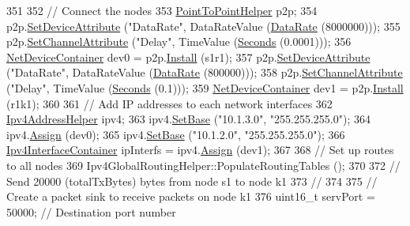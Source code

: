 \begin{DoxyCode}
351 
352   \textcolor{comment}{// Connect the nodes}
353   \hyperlink{classns3_1_1PointToPointHelper}{PointToPointHelper} p2p;
354   p2p.\hyperlink{classns3_1_1PointToPointHelper_a4577f5ab8c387e5528af2e0fbab1152e}{SetDeviceAttribute} (\textcolor{stringliteral}{"DataRate"}, DataRateValue (\hyperlink{classns3_1_1DataRate}{DataRate} (8000000)));
355   p2p.\hyperlink{classns3_1_1PointToPointHelper_a6b5317fd17fb61e5a53f8d66a90b63b9}{SetChannelAttribute} (\textcolor{stringliteral}{"Delay"}, TimeValue (\hyperlink{group__timecivil_ga33c34b816f8ff6628e33d5c8e9713b9e}{Seconds} (0.0001)));
356   \hyperlink{classns3_1_1NetDeviceContainer}{NetDeviceContainer} dev0 = p2p.\hyperlink{classns3_1_1PointToPointHelper_ab9162fea3e88722666fed1106df1f9ec}{Install} (s1r1);
357   p2p.\hyperlink{classns3_1_1PointToPointHelper_a4577f5ab8c387e5528af2e0fbab1152e}{SetDeviceAttribute} (\textcolor{stringliteral}{"DataRate"}, DataRateValue (\hyperlink{classns3_1_1DataRate}{DataRate} (800000)));
358   p2p.\hyperlink{classns3_1_1PointToPointHelper_a6b5317fd17fb61e5a53f8d66a90b63b9}{SetChannelAttribute} (\textcolor{stringliteral}{"Delay"}, TimeValue (\hyperlink{group__timecivil_ga33c34b816f8ff6628e33d5c8e9713b9e}{Seconds} (0.1)));
359   \hyperlink{classns3_1_1NetDeviceContainer}{NetDeviceContainer} dev1 = p2p.\hyperlink{classns3_1_1PointToPointHelper_ab9162fea3e88722666fed1106df1f9ec}{Install} (r1k1);
360 
361   \textcolor{comment}{// Add IP addresses to each network interfaces}
362   \hyperlink{classns3_1_1Ipv4AddressHelper}{Ipv4AddressHelper} ipv4;
363   ipv4.\hyperlink{classns3_1_1Ipv4AddressHelper_acf7b16dd25bac67e00f5e25f90a9a035}{SetBase} (\textcolor{stringliteral}{"10.1.3.0"}, \textcolor{stringliteral}{"255.255.255.0"});
364   ipv4.\hyperlink{classns3_1_1Ipv4AddressHelper_af8e7f4a1a7e74c00014a1eac445a27af}{Assign} (dev0);
365   ipv4.\hyperlink{classns3_1_1Ipv4AddressHelper_acf7b16dd25bac67e00f5e25f90a9a035}{SetBase} (\textcolor{stringliteral}{"10.1.2.0"}, \textcolor{stringliteral}{"255.255.255.0"});
366   \hyperlink{classns3_1_1Ipv4InterfaceContainer}{Ipv4InterfaceContainer} ipInterfs = ipv4.\hyperlink{classns3_1_1Ipv4AddressHelper_af8e7f4a1a7e74c00014a1eac445a27af}{Assign} (dev1);
367 
368   \textcolor{comment}{// Set up routes to all nodes}
369   Ipv4GlobalRoutingHelper::PopulateRoutingTables ();
370 
372   \textcolor{comment}{// Send 20000 (totalTxBytes) bytes from node s1 to node k1}
373   \textcolor{comment}{//}
374 
375   \textcolor{comment}{// Create a packet sink to receive packets on node k1}
376   uint16\_t servPort = 50000; \textcolor{comment}{// Destination port number}

\end{DoxyCode}
